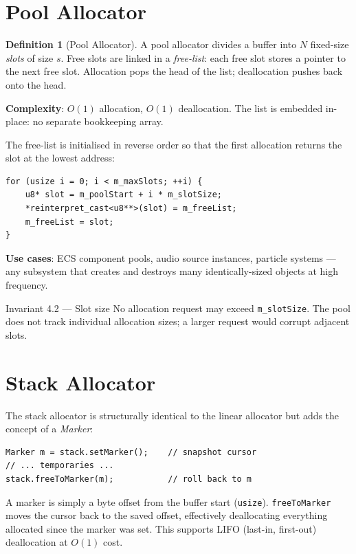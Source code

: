 \documentclass[12pt, a4paper]{report}
\theoremstyle{definition}
\newtheorem{definition}{Definition}[section]
\theoremstyle{remark}
\begin{document}
\section{Pool Allocator}

\begin{definition}[Pool Allocator]
A pool allocator divides a buffer into $N$ fixed-size \emph{slots} of
size $s$. Free slots are linked in a \emph{free-list}: each free slot
stores a pointer to the next free slot. Allocation pops the head of the
list; deallocation pushes back onto the head.
\end{definition}

\textbf{Complexity}: $O(1)$ allocation, $O(1)$ deallocation.
The list is embedded in-place: no separate bookkeeping array.

The free-list is initialised in reverse order so that the first
allocation returns the slot at the lowest address:

\begin{lstlisting}[caption={Free-list initialisation (reversed)}]
for (usize i = 0; i < m_maxSlots; ++i) {
    u8* slot = m_poolStart + i * m_slotSize;
    *reinterpret_cast<u8**>(slot) = m_freeList;
    m_freeList = slot;
}
\end{lstlisting}

\textbf{Use cases}: ECS component pools, audio source instances,
particle systems — any subsystem that creates and destroys many
identically-sized objects at high frequency.

\begin{specbox}{Invariant 4.2 — Slot size}
  No allocation request may exceed \texttt{m\_slotSize}.
  The pool does not track individual allocation sizes; a larger
  request would corrupt adjacent slots.
\end{specbox}

\section{Stack Allocator}

The stack allocator is structurally identical to the linear allocator
but adds the concept of a \emph{Marker}:

\begin{lstlisting}[caption={Marker-based rollback}]
Marker m = stack.setMarker();    // snapshot cursor
// ... temporaries ...
stack.freeToMarker(m);           // roll back to m
\end{lstlisting}

A marker is simply a byte offset from the buffer start (\texttt{usize}).
\texttt{freeToMarker} moves the cursor back to the saved offset,
effectively deallocating everything allocated since the marker was set.
This supports LIFO (last-in, first-out) deallocation at $O(1)$ cost.
\end{document}
